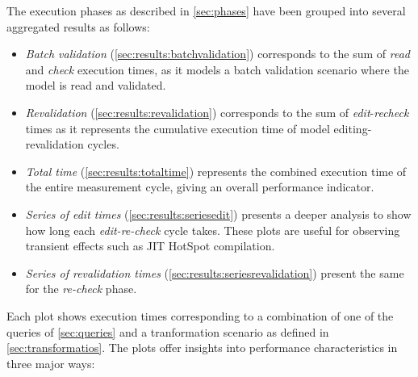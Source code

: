 
The execution phases as described in \autoref{sec:phases} have been grouped into several aggregated results as follows:

\begin{itemize}
  \item \emph{Batch validation} (\autoref{sec:results:batchvalidation}) corresponds to the sum of \emph{read} and \emph{check} execution times, as it models a batch validation scenario where the model is read and validated.
  \item \emph{Revalidation} (\autoref{sec:results:revalidation}) corresponds to the sum of \emph{edit}-\emph{recheck} times as it represents the cumulative execution time of model editing-revalidation cycles.
  \item \emph{Total time} (\autoref{sec:results:totaltime}) represents the combined execution time of the entire measurement cycle, giving an overall performance indicator.
  \item \emph{Series of edit times} (\autoref{sec:results:seriesedit}) presents a deeper analysis to show how long each \emph{edit-re-check} cycle takes. These plots are useful for observing transient effects such as JIT HotSpot compilation.
  \item \emph{Series of revalidation times} (\autoref{sec:results:seriesrevalidation}) present the same for the \emph{re-check} phase.
\end{itemize}


Each plot shows execution times corresponding to a combination of one of the queries of \autoref{sec:queries} and a tranformation scenario as defined in \autoref{sec:transformatios}. The plots offer insights into performance characteristics in three major ways:

